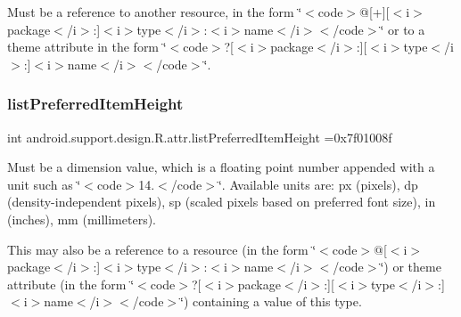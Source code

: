 Must be a reference to another resource, in the form \char`\"{}$<$code$>$@\mbox{[}+\mbox{]}\mbox{[}$<$i$>$package$<$/i$>$\+:\mbox{]}$<$i$>$type$<$/i$>$\+:$<$i$>$name$<$/i$>$$<$/code$>$\char`\"{} or to a theme attribute in the form \char`\"{}$<$code$>$?\mbox{[}$<$i$>$package$<$/i$>$\+:\mbox{]}\mbox{[}$<$i$>$type$<$/i$>$\+:\mbox{]}$<$i$>$name$<$/i$>$$<$/code$>$\char`\"{}. \mbox{\label{classandroid_1_1support_1_1design_1_1R_1_1attr_afd914d37ccd3774be092e75022f888ee}} 
\subsubsection{\texorpdfstring{list\+Preferred\+Item\+Height}{listPreferredItemHeight}}
{\footnotesize\ttfamily int android.\+support.\+design.\+R.\+attr.\+list\+Preferred\+Item\+Height =0x7f01008f\hspace{0.3cm}{\ttfamily [static]}}

Must be a dimension value, which is a floating point number appended with a unit such as \char`\"{}$<$code$>$14.\+5sp$<$/code$>$\char`\"{}. Available units are\+: px (pixels), dp (density-\/independent pixels), sp (scaled pixels based on preferred font size), in (inches), mm (millimeters). 

This may also be a reference to a resource (in the form \char`\"{}$<$code$>$@\mbox{[}$<$i$>$package$<$/i$>$\+:\mbox{]}$<$i$>$type$<$/i$>$\+:$<$i$>$name$<$/i$>$$<$/code$>$\char`\"{}) or theme attribute (in the form \char`\"{}$<$code$>$?\mbox{[}$<$i$>$package$<$/i$>$\+:\mbox{]}\mbox{[}$<$i$>$type$<$/i$>$\+:\mbox{]}$<$i$>$name$<$/i$>$$<$/code$>$\char`\"{}) containing a value of this type. \mbox{\label{classandroid_1_1support_1_1design_1_1R_1_1attr_a3adf33dcb6fd984d1d7aee11e167ba4b}} 
